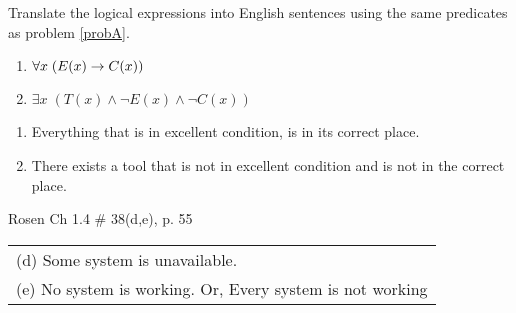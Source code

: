 \begin{questions}
 Translate the logical expressions into English sentences using the same predicates as problem \ref{probA}.
\begin{enumerate}[label=(\alph*),itemsep=0pt,parsep=0pt,
  topsep=0pt,partopsep=0pt]
    \item $\forall x\; (E(x) \rightarrow C(x))$ \hspace*{1in} %
    \item $\exists x\; (T(x) \wedge \neg E(x) \wedge \neg C(x))$ 
\end{enumerate}
  \ifprintanswers
        \vspace{-12pt}
    \fi
  \begin{solution}
  \begin{enumerate}[label=(\alph*),itemsep=0pt,parsep=0pt,
  topsep=0pt,partopsep=0pt]
      \item Everything that is in excellent condition, is in its correct place.
      \item There exists a tool that is not in excellent condition and is not in the correct place.
    \end{enumerate}
  \end{solution}




 Rosen Ch 1.4 \# 38(d,e), p. 55
    \ifprintanswers
        \vspace{-12pt}
    \fi
  \begin{solution}
      \begin{tabular}{l} 
        (d) Some system is unavailable. \\
        (e) No system is working.  Or, Every system is not working
      \end{tabular}
  \end{solution}





\end{questions}
